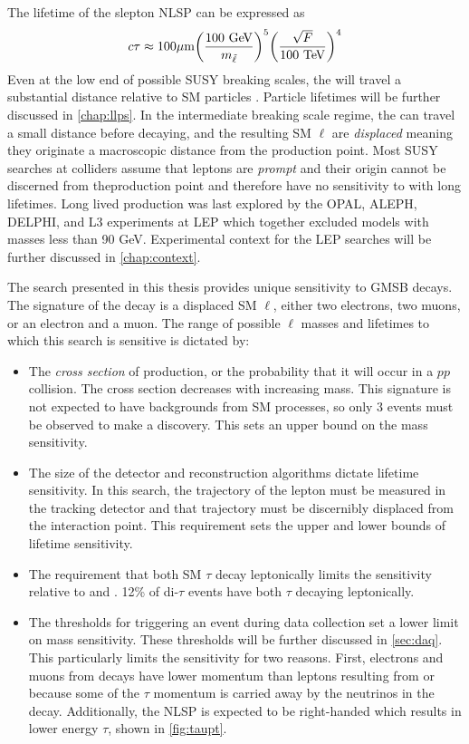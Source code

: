 The lifetime of the slepton \ac{NLSP} can be expressed as
\begin{equation}
   c \tau \approx 100 \um \bigg(\frac{100 \GeV}{m_{\slep}}\bigg)^5\bigg(\frac{\sqrt{F}}{100 \TeV}\bigg)^4
\label{eq:lt}
\end{equation}
Even at the low end of possible \ac{SUSY} breaking scales, the \slep will travel a substantial distance relative to \ac{SM} particles \cite{jesseshelton}. Particle lifetimes will be further discussed in \autoref{chap:llps}. In the intermediate breaking scale regime, the \slep can travel a small distance before decaying, and the resulting \ac{SM} $\ell$ are \emph{displaced} meaning they originate a macroscopic distance from the \slep production point. Most \ac{SUSY} searches at colliders assume that leptons are \emph{prompt} and their origin cannot be discerned from the\slep production point and therefore have no sensitivity to \slep with long lifetimes. Long lived \slep production was last explored by the OPAL, ALEPH, DELPHI, and L3 experiments at \ac{LEP} which together excluded models with \slep masses less than 90 GeV. Experimental context for the LEP searches will be further discussed in \autoref{chap:context}.


The search presented in this thesis provides unique sensitivity to \ac{GMSB} \slep decays. The signature of the decay is a displaced \ac{SM} $\ell$, either two electrons, two muons, or an electron and a muon. The range of possible $\ell$ masses and lifetimes to which this search is sensitive is dictated by:
\begin{itemize}
	\item The \emph{cross section} of \slep production, or the probability that it will occur in a $pp$ collision. The cross section decreases with increasing \slep mass. This signature is not expected to have backgrounds from \ac{SM} processes, so only 3 events must be observed to make a discovery. This sets an upper bound on the mass sensitivity.
	\item The size of the detector and reconstruction algorithms dictate lifetime sensitivity. In this search, the trajectory of the lepton must be measured in the tracking detector and that trajectory must be discernibly displaced from the interaction point. This requirement sets the upper and lower bounds of lifetime sensitivity.
	\item The requirement that both \ac{SM} $\tau$ decay leptonically limits the \stau sensitivity relative to \selec and \smu. 12\% of di-$\tau$ events have both $\tau$ decaying leptonically. 
	\item The thresholds for triggering an event during data collection set a lower limit on mass sensitivity. These thresholds will be further discussed in \autoref{sec:daq}. This particularly limits the \stau sensitivity for two reasons. First, electrons and muons from \stau decays have lower momentum than leptons resulting from \selec or \smu because some of the $\tau$ momentum is carried away by the neutrinos in the decay. Additionally, the \stau \ac{NLSP} is expected to be right-handed which results in lower energy $\tau$, shown in \autoref{fig:taupt}. 
\end{itemize}



